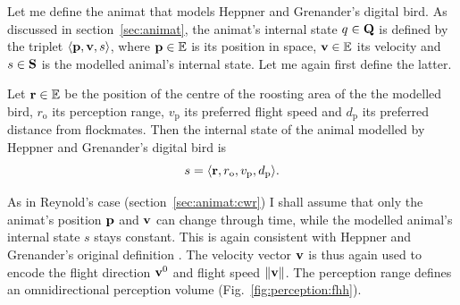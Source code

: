 Let me define the animat that models Heppner and Grenander's digital bird. As discussed in section~\ref{sec:animat}, the animat's internal state $q \in {\ensuremath{\mathbf{Q}}}$ is defined by the triplet $\langle {\ensuremath{\mathbf{p}}}, {\mathbf{v}}, s \rangle$, where ${\mathbf{p}} \in \mathbb{E}$ is its position in space, ${\mathbf{v}} \in \mathbb{E}$ its velocity and $s \in {\ensuremath{\mathbf{S}}}$ is the modelled animal's internal state. Let me again first define the latter. 

\begin{defn}
\label{def:animat:s:fhh}
Let ${\mathbf{r}} \in \mathbb{E}$ be the position of the centre of the roosting area of the the modelled bird, $r_\mathrm{o}$ its perception range, $v_\mathrm{p}$ its preferred flight speed and $d_\mathrm{p}$ its preferred distance from flockmates. Then the internal state of the animal modelled by Heppner and Grenander's digital bird is
\begin{equation}
s=\langle {\ensuremath{\mathbf{r}}}, r_\mathrm{o}, v_\mathrm{p}, d_\mathrm{p} \rangle.
\end{equation}
\end{defn}

As in Reynold's case (section~\ref{sec:animat:cwr}) I shall assume that only the animat's position ${\mathbf{p}}$ and ${\mathbf{v}}$ can change through time, while the 	modelled animal's internal state $s$ stays constant. This is again consistent with Heppner and Grenander's original definition \cite{heppner:1990}. 
The velocity vector ${\mathbf{v}}$ is thus again used to encode the flight direction ${\mathbf{v}}^0$ and flight speed $\left\|{\mathbf{v}}\right\|$. The perception range defines an omnidirectional perception volume (Fig.~\ref{fig:perception:fhh}).

